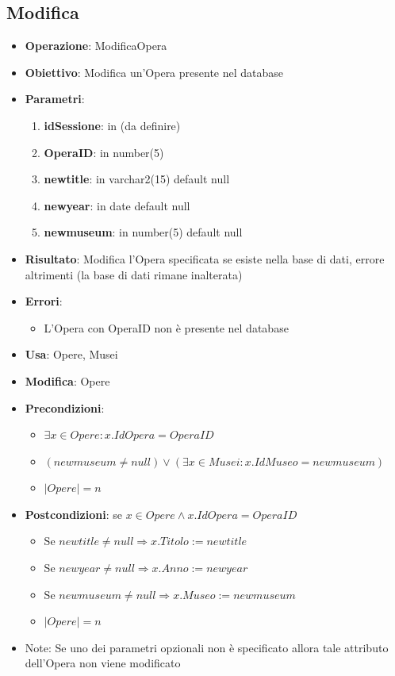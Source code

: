 \documentclass[a4paper,11pt]{article}
\begin{document}
\subsection{Modifica}
\begin{itemize}
	\item \textbf{Operazione}: ModificaOpera
	\item \textbf{Obiettivo}: Modifica un'Opera presente nel database
	\item \textbf{Parametri}:
	\begin{enumerate}
		\item \textbf{idSessione}: in (da definire)
		\item \textbf{OperaID}: in number(5)
		\item \textbf{newtitle}: in varchar2(15) default null
		\item \textbf{newyear}: in date default null
		\item \textbf{newmuseum}: in number(5) default null
	\end{enumerate}
	\item \textbf{Risultato}: Modifica l'Opera specificata se esiste nella base di dati, errore altrimenti (la base di dati rimane inalterata)
	\item \textbf{Errori}: 
	\begin{itemize}
		\item L'Opera con OperaID non è presente nel database
	\end{itemize}
	\item \textbf{Usa}: Opere, Musei
	\item \textbf{Modifica}: Opere
	\item \textbf{Precondizioni}:
	\begin{itemize}
		\item $\exists x \in Opere : x.IdOpera = OperaID$
		\item $(newmuseum \ne null) \lor (\exists x \in Musei : x.IdMuseo = newmuseum)$
		\item $|Opere| = n$
	\end{itemize}
	\item \textbf{Postcondizioni}: se $x \in Opere \land x.IdOpera = OperaID$
	\begin{itemize}
		\item Se $newtitle \ne null \Rightarrow x.Titolo := newtitle$
		\item Se $newyear \ne null \Rightarrow x.Anno := newyear$
		\item Se $newmuseum \ne null \Rightarrow x.Museo := newmuseum$
		\item $|Opere| = n$
	\end{itemize}
	\item Note: Se uno dei parametri opzionali non è specificato allora tale attributo 
	dell'Opera non viene modificato
\end{itemize}
\end{document}
